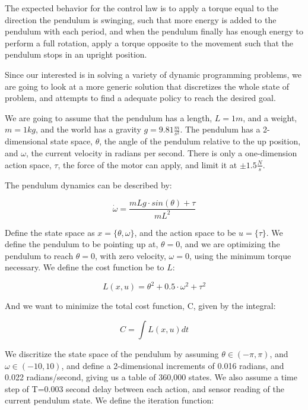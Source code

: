 \documentclass[12pt]{report}
\begin{document}
The expected behavior for the control law is to apply a torque equal to the direction the pendulum is swinging, such that more energy is added to the pendulum with each period, and when the pendulum finally has enough energy to perform a full rotation, apply a torque opposite to the movement such that the pendulum stops in an upright position.  

Since our interested is in solving a variety of dynamic programming problems, we are going to look at a more generic solution that discretizes the whole state of problem, and attempts to find a adequate policy to reach the desired goal.

We are going to assume that the pendulum has a length, $L=1m$, and a weight, $m=1kg$, and the world has a gravity $g=9.81\frac{m}{s^2}$. The pendulum has a 2-dimensional state space, $\theta$, the angle of the pendulum relative to the up position, and $\omega$, the current velocity in radians per second. There is only a one-dimension action space, $\tau$, the force of the motor can apply, and limit it at $\pm 1.5 \frac{N}{s}$.

The pendulum dynamics can be described by:

\begin{equation} 
\dot{\omega} = \frac{mLg \cdot sin(\theta) + \tau}{mL^2}
\end{equation}

Define the state space as $x=\{\theta, \omega\}$, and the action space to be $u=\{\tau\}$. We define the pendulum to be pointing up at, $\theta = 0$, and we are optimizing the pendulum to reach $\theta = 0$, with zero velocity, $\omega = 0$, using the minimum torque necessary. We define the cost function be to $L$:

\begin{equation} 
L(x,u) = \theta^2 + 0.5 \cdot \omega^2 + \tau^2
\end{equation}

And we want to minimize the total cost function, C, given by the integral: 

\begin{equation} 
C = \int L(x,u) dt
\end{equation}

We discritize the state space of the pendulum by assuming $\theta \in  (-\pi,\pi)$, and $\omega \in (-10,10)$, and define a 2-dimensional increments of 0.016 radians, and 0.022 radians/second, giving us a table of 360,000 states. We also assume a time step of T=0.003 second delay between each action, and sensor reading of the current pendulum state. We define the iteration function:
\end{document}
